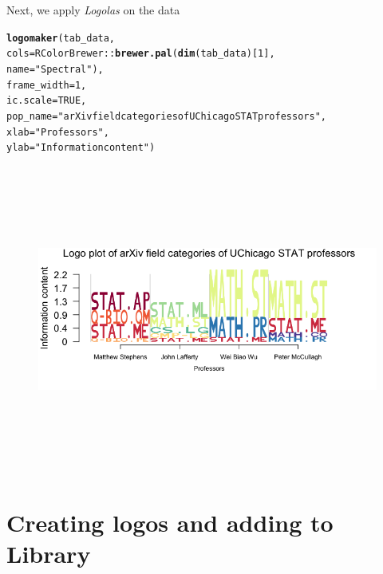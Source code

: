 \documentclass[12pt]{article}\usepackage[]{graphicx}\usepackage[usenames,dvipsnames]{color}
\makeatletter
\newcommand{\hlnum}[1]{\textcolor[rgb]{0.686,0.059,0.569}{#1}}%
\newcommand{\hlstr}[1]{\textcolor[rgb]{0.192,0.494,0.8}{#1}}%
\newcommand{\hlopt}[1]{\textcolor[rgb]{0,0,0}{#1}}%
\newcommand{\hlstd}[1]{\textcolor[rgb]{0.345,0.345,0.345}{#1}}%
\newcommand{\hlkwc}[1]{\textcolor[rgb]{0.333,0.667,0.333}{#1}}%
\newcommand{\hlkwd}[1]{\textcolor[rgb]{0.737,0.353,0.396}{\textbf{#1}}}%
\newenvironment{kframe}{%
 \def\at@end@of@kframe{}%
 \ifinner\ifhmode%
  \def\at@end@of@kframe{\end{minipage}}%
  \begin{minipage}{\columnwidth}%
 \fi\fi%
 \def\FrameCommand##1{\hskip\@totalleftmargin \hskip-\fboxsep
 \colorbox{shadecolor}{##1}\hskip-\fboxsep
     \hskip-\linewidth \hskip-\@totalleftmargin \hskip\columnwidth}%
 \MakeFramed {\advance\hsize-\width
   \@totalleftmargin\z@ \linewidth\hsize
   \@setminipage}}%
 {\par\unskip\endMakeFramed%
 \at@end@of@kframe}
\newenvironment{knitrout}{}{} %
\newcommand{\Logolas}{\textit{Logolas}}
\makeatother
\begin{document}
Next, we apply \Logolas{} on the data

\begin{knitrout}
\color{fgcolor}\begin{kframe}
\begin{alltt}
\hlkwd{logomaker}\hlstd{(tab_data,}
          \hlkwc{cols}\hlstd{= RColorBrewer}\hlopt{::}\hlkwd{brewer.pal}\hlstd{(}\hlkwd{dim}\hlstd{(tab_data)[}\hlnum{1}\hlstd{],}
          \hlkwc{name} \hlstd{=} \hlstr{"Spectral"}\hlstd{),}
          \hlkwc{frame_width} \hlstd{=} \hlnum{1}\hlstd{,}
          \hlkwc{ic.scale} \hlstd{=} \hlnum{TRUE}\hlstd{,}
          \hlkwc{pop_name} \hlstd{=} \hlstr{"arXiv field categories of UChicago STAT professors"}\hlstd{,}
          \hlkwc{xlab} \hlstd{=} \hlstr{"Professors"}\hlstd{,}
          \hlkwc{ylab} \hlstd{=} \hlstr{"Information content"}\hlstd{)}
\end{alltt}
\end{kframe}
\end{knitrout}

\begin{figure}[htp]
\begin{center}
\includegraphics[width=7in,height=4in]{figures/logolas_arxiv_1.png}
\end{center}
\end{figure}

\section{Creating logos and adding to Library}
\end{document}
